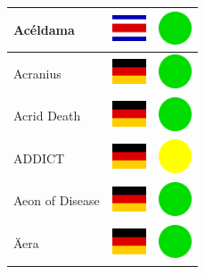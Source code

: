\documentclass[12pt, a4paper, twoside]{report}
\begin{document}
\begin{center}
\begin{longtable}{|p{5cm}|p{2cm}|p{2cm}|}
 Acéldama                                                   & \includegraphics[width=1cm]{../img/flags/cr} &   \includegraphics[width=1cm]{../likes/y} \\ \hline
 Acranius                                                   & \includegraphics[width=1cm]{../img/flags/de} &   \includegraphics[width=1cm]{../likes/y} \\ \hline
 Acrid Death                                                & \includegraphics[width=1cm]{../img/flags/de} &   \includegraphics[width=1cm]{../likes/y} \\ \hline
 ADDICT                                                     & \includegraphics[width=1cm]{../img/flags/de} &   \includegraphics[width=1cm]{../likes/m} \\ \hline
 Aeon of Disease                                            & \includegraphics[width=1cm]{../img/flags/de} &   \includegraphics[width=1cm]{../likes/y} \\ \hline
 Äera                                                       & \includegraphics[width=1cm]{../img/flags/de} &   \includegraphics[width=1cm]{../likes/y} \\ \hline

\end{longtable}
\end{center}
\end{document}
